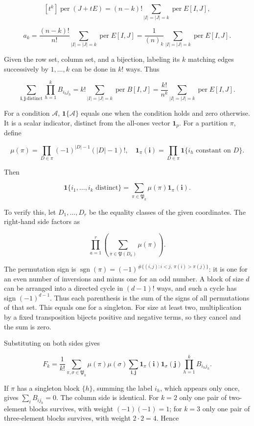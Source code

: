 \documentclass[11pt,a4paper]{article}
\begin{document}
\[
[t^k]\operatorname{per}(J+tE)
=(n-k)!\sum_{|I|=|J|=k}\operatorname{per}E[I,J],
\]

\[
a_k=\frac{(n-k)!}{n!}\sum_{|I|=|J|=k}\operatorname{per}E[I,J]
=\frac1{(n)_k}\sum_{|I|=|J|=k}\operatorname{per}E[I,J].
\]

Given the row set, column set, and a bijection, labeling its \(k\) matching edges successively by \(1,\ldots,k\) can be done in \(k!\) ways. Thus

\[
\sum_{\boldsymbol i,\boldsymbol j\ \mathrm{distinct}}\prod_{h=1}^kB_{i_hj_h}
=k!\sum_{|I|=|J|=k}\operatorname{per}B[I,J]
=\frac{k!}{n^k}\sum_{|I|=|J|=k}\operatorname{per}E[I,J].
\]

For a condition \(\mathcal A\), \(\mathbf1\{\mathcal A\}\) equals one when the condition holds and zero otherwise. It is a scalar indicator, distinct from the all-ones vector \(\mathbf1_p\). For a partition \(\pi\), define

\[
\mu(\pi)=\prod_{D\in\pi}(-1)^{|D|-1}(|D|-1)!,\quad
\mathbf1_\pi(\boldsymbol i)=\prod_{D\in\pi}\mathbf1\{i_h\text{ constant on }D\text{}\}.
\]

Then

\[
\mathbf1\{i_1,\ldots,i_k\text{ distinct}\}
=\sum_{\pi\in\mathfrak P_k}\mu(\pi)\mathbf1_\pi(\boldsymbol i).
\]

To verify this, let \(D_1,\ldots,D_r\) be the equality classes of the given coordinates. The right-hand side factors as

\[
\prod_{a=1}^r\left(\sum_{\pi\in\mathfrak P(D_a)}\mu(\pi)\right).
\]

The permutation sign is \(\operatorname{sgn}(\pi)=(-1)^{\#\{(i,j):i<j,\ \pi(i)>\pi(j)\}}\): it is one for an even number of inversions and minus one for an odd number. A block of size \(d\) can be arranged into a directed cycle in \((d-1)!\) ways, and such a cycle has sign \((-1)^{d-1}\). Thus each parenthesis is the sum of the signs of all permutations of that set. This equals one for a singleton. For size at least two, multiplication by a fixed transposition bijects positive and negative terms, so they cancel and the sum is zero.

Substituting on both sides gives

\[
F_k=\frac1{k!}\sum_{\pi,\sigma\in\mathfrak P_k}\mu(\pi)\mu(\sigma)
\sum_{\boldsymbol i,\boldsymbol j}\mathbf1_\pi(\boldsymbol i)\mathbf1_\sigma(\boldsymbol j)
\prod_{h=1}^kB_{i_hj_h}.
\]

If \(\pi\) has a singleton block \(\{h\}\), summing the label \(i_h\), which appears only once, gives \(\sum_iB_{ij_h}=0\). The column side is identical. For \(k=2\) only one pair of two-element blocks survives, with weight \((-1)(-1)=1\); for \(k=3\) only one pair of three-element blocks survives, with weight \(2\cdot2=4\). Hence
\end{document}
